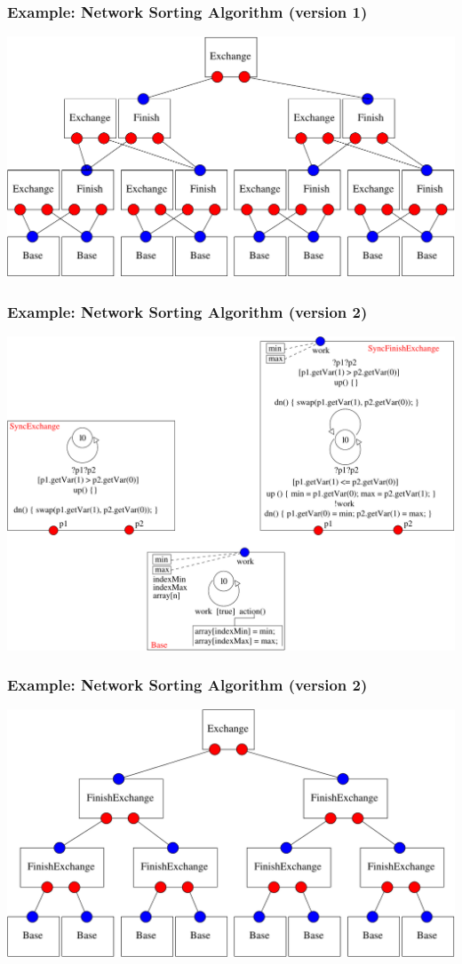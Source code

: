 \documentclass[compress,xcolor=dvipsnames,10pt]{beamer}
\begin{document}
\begin{frame}
 \frametitle{Example: Network Sorting Algorithm (version 1)}
 \begin{center}
  \includegraphics[scale=0.45]{figs/nsa2v1.pdf}
 \end{center}
 \end{frame}
 
 \begin{frame}
 \frametitle{Example: Network Sorting Algorithm (version 2)}
 \begin{center}
  \includegraphics[scale=0.45]{figs/nsa1v2.pdf}
 \end{center}
\end{frame}


\begin{frame}
 \frametitle{Example: Network Sorting Algorithm (version 2)}
 \begin{center}
  \includegraphics[scale=0.45]{figs/nsa2v2.pdf}
 \end{center}
\end{frame}
\end{document}
